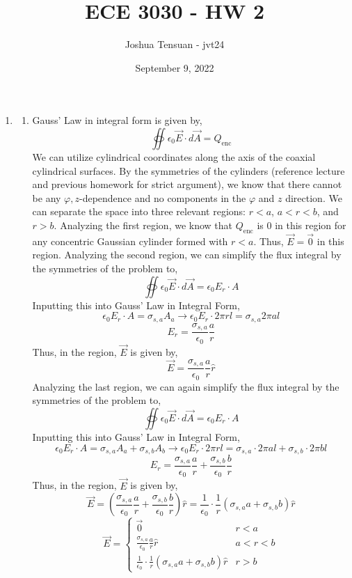 \documentclass[12pt]{article}
\begin{document}
\usetikzlibrary{scopes}
\def\iangle{35} %

\def\down{-90}
\def\arcr{0.5cm} %


\title{ECE 3030 - HW 2}
\author{Joshua Tensuan - jvt24}
\date{September 9, 2022}
\maketitle


\begin{enumerate}
	\item [2.1]
	\begin{enumerate}
		\item [a.]
		Gauss' Law in integral form is given by,
		\[\oiint \epsilon_0 \vec E \cdot d\vec A = Q_{\mathrm{enc}}\]
		We can utilize cylindrical coordinates along the axis of the coaxial cylindrical surfaces.
		By the symmetries of the cylinders (reference lecture and previous homework for strict argument), we know that there cannot be any $\varphi, z$-dependence and no components in the $\varphi$ and $z$ direction.
		We can separate the space into three relevant regions: $r<a$, $a<r<b$, and $r>b$.
		Analyzing the first region, we know that $Q_{\mathrm{enc}}$ is 0 in this region for any concentric Gaussian cylinder formed with $r<a$.
		Thus, $\vec E = \vec 0$ in this region.
		Analyzing the second region, we can simplify the flux integral by the symmetries of the problem to,
		\[\oiint \epsilon_0\vec E \cdot d\vec A = \epsilon_0E_r\cdot A\]
		Inputting this into Gauss' Law in Integral Form,
		\[\epsilon_0E_r\cdot A = \sigma_{s,a}A_a\to \epsilon_0E_r\cdot2\pi rl = \sigma_{s,a}2\pi a l\]
		\[E_r = \frac{\sigma_{s,a}}{\epsilon_0}\frac{a}{r}\]
		Thus, in the region, $\vec E$ is given by,
		\[\vec E = \frac{\sigma_{s,a}}{\epsilon_0}\frac{a}{r}\hat r\]
		Analyzing the last region, we can again simplify the flux integral by the symmetries of the problem to,
		\[\oiint \epsilon_0 \vec E \cdot d\vec A = \epsilon_0 E_r\cdot A\]
		Inputting this into Gauss' Law in Integral Form,
		\[\epsilon_0E_r\cdot A = \sigma_{s,a}A_a + \sigma_{s,b}A_b\to \epsilon_0E_r\cdot 2\pi rl = \sigma_{s,a}\cdot2\pi al+\sigma_{s,b}\cdot 2 \pi bl\]
		\[E_r = \frac{\sigma_{s,a}}{\epsilon_0}\frac{a}{r}+\frac{\sigma_{s,b}}{\epsilon_0}\frac{b}{r}\]
		Thus, in the region, $\vec E$ is given by,
		\[\vec E = \left(\frac{\sigma_{s,a}}{\epsilon_0}\frac{a}{r}+\frac{\sigma_{s,b}}{\epsilon_0}\frac{b}{r}\right) \hat r=\frac{1}{\epsilon_0}\cdot\frac{1}{r}\left(\sigma_{s,a}a + \sigma_{s,b}b\right)\hat r\]
		\[\boxed{\vec E = \begin{cases}
			\vec 0 & r < a \\ 
			\frac{\sigma_{s,a}}{\epsilon_0}\frac{a}{r}\hat r & a < r < b \\ 
			\frac{1}{\epsilon_0}\cdot \frac{1}{r}(\sigma_{s,a}a + \sigma_{s,b}b)\hat r & r > b
		\end{cases}}\]


\end{enumerate}
\end{enumerate}
\end{document}
